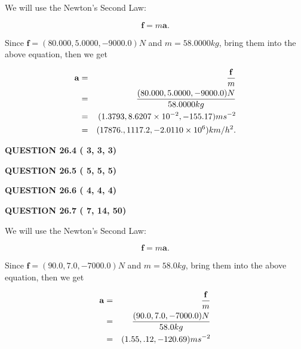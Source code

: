\documentclass[12pt]{article}
\begin{document}
We will use the Newton's Second Law:
 
\[
\mathbf{f}=m\mathbf{a}.
\]
 
Since $\mathbf{f}=( %
80.000,  %
5.0000,  %
-9000.0 )N$
and $m= %
58.0000kg$, bring them into the above equation, then we get
 
\begin{eqnarray*}
\mathbf{a}&=&\frac{\mathbf{f}}m  \\
&=&\frac{(
80.000 ,
5.0000 ,
-9000.0 )N
}{ %
58.0000 kg}  \\
&=&(
1.3793 ,
8.6207 \times 10^{-2},
-155.17
)ms^{-2} \\
&=&(
17876. ,
1117.2 ,
-2.0110 \times 10^{6}
)km/h^2.
\end{eqnarray*}
 
 
 
  
\vspace{0.2in}
  
{\textbf{\Large{QUESTION
26.4 
 (          3,          3,          3)
}}}
  
  
  
\vspace{0.2in}
  
{\textbf{\Large{QUESTION
26.5 
 (          5,          5,          5)
}}}
  
  
  
\vspace{0.2in}
  
{\textbf{\Large{QUESTION
26.6 
 (          4,          4,          4)
}}}
  
  
  
\vspace{0.2in}
  
{\textbf{\Large{QUESTION
26.7 
 (          7,         14,         50)
}}}
  
  
 
 

We will use the Newton's Second Law:
 
\[
\mathbf{f}=m\mathbf{a}.
\]
 
Since $\mathbf{f}= %
(90.0 , 7.0 , -7000.0) N$
and $m= %
58.0kg$, bring them into the above equation, then we get
 
\begin{eqnarray*}
\mathbf{a}&=&\frac{\mathbf{f}}m  \\
&=&\frac{ %
(90.0 , 7.0 , -7000.0) N}{ %
58.0kg}  \\
&=& %
(1.55 , .12 , -120.69) ms^{-2}
\end{eqnarray*}
 
\end{document}
